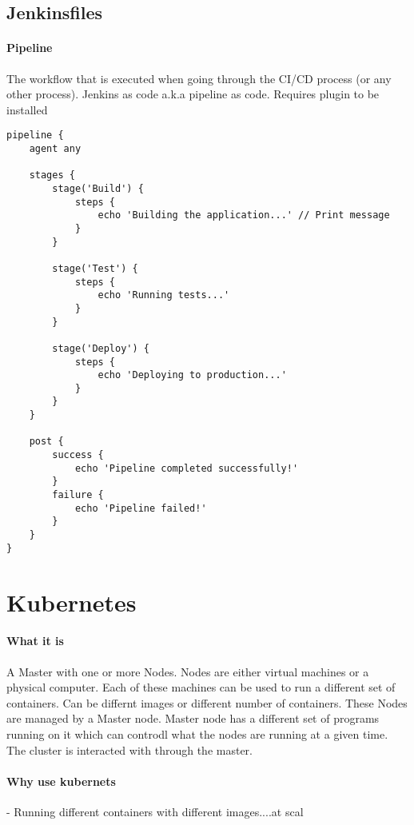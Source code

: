 \documentclass[a4paper, 11pt]{book}
\begin{document}
    \subsection{Jenkinsfiles}

    \paragraph{Pipeline}
    The workflow that is executed when going through the CI/CD process (or any other process).
    Jenkins as code a.k.a pipeline as code. Requires plugin to be installed

    \begin{lstlisting}[caption=Jenkinsfile for a CI/CD Pipeline]
pipeline {
    agent any

    stages {
        stage('Build') {
            steps {
                echo 'Building the application...' // Print message
            }
        }

        stage('Test') {
            steps {
                echo 'Running tests...'
            }
        }

        stage('Deploy') {
            steps {
                echo 'Deploying to production...'
            }
        }
    }

    post {
        success {
            echo 'Pipeline completed successfully!'
        }
        failure {
            echo 'Pipeline failed!'
        }
    }
}
    \end{lstlisting}


    \section{Kubernetes}

    \paragraph{What it is}
    A Master with one or more Nodes.
    Nodes are either virtual machines or a physical computer.
    Each of these machines can be used to run a different set of containers.
    Can be differnt images or different number of containers.
    These Nodes are managed by a Master node.
    Master node has a different set of programs running on it which can controdl what the nodes are running at a given time.
    The cluster is interacted with through the master.

    \paragraph{Why use kubernets} - Running different containers with different images....at scal
\end{document}
